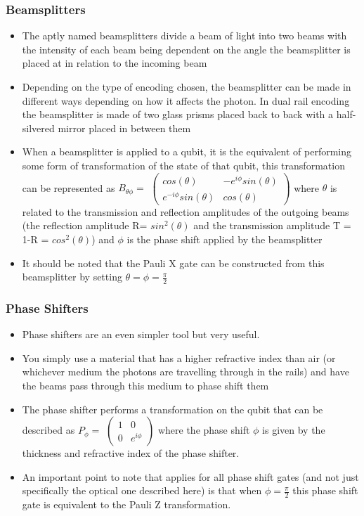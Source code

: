 \subsubsection{Beamsplitters}
\begin{itemize}
    \item The aptly named beamsplitters divide a beam of light into two beams with the intensity of each beam being dependent on the angle the beamsplitter is placed at in relation to the incoming beam
    \item Depending on the type of encoding  chosen, the beamsplitter can be made in different ways depending on how it affects the photon. In dual rail encoding the beamsplitter is made of two glass prisms placed back to back with a half-silvered mirror placed in between them %
    \item When a beamsplitter is applied to a qubit, it is the equivalent of performing some form of transformation of the state of that qubit, this transformation can be represented as $B_{\theta\phi} = $ $\begin{pmatrix}
    cos(\theta) & -e^{i\phi}sin(\theta) \\
    e^{-i\phi}sin(\theta) & cos(\theta) 
    \end{pmatrix}$ where $\theta$ is related to the transmission and reflection amplitudes of the outgoing beams (the reflection amplitude R= $sin^2(\theta)$ and the transmission amplitude T = 1-R = $cos^2(\theta)$) and $\phi$ is the phase shift applied by the beamsplitter
    \item It should be noted that the Pauli X gate can be constructed from this beamsplitter by setting $\theta = \phi = \frac{\pi}{2}$
    
\end{itemize}
\subsubsection{Phase Shifters}
\begin{itemize}
    \item Phase shifters are an even simpler tool but very useful.
    \item You simply use a material that has a higher refractive index than air (or whichever medium the photons are travelling through in the rails) and have the beams pass through this medium to phase shift them
    \item The phase shifter performs a transformation on the qubit that can be described as $P_\phi = $ $\begin{pmatrix}
    1 & 0 \\
    0 & e^{i\phi}
    \end{pmatrix}$ where the phase shift $\phi$ is given by the thickness and refractive index of the phase shifter.
    \item An important point to note that applies for all phase shift gates (and not just specifically the optical one described here) is that when $\phi = \frac{\pi}{2}$ this phase shift gate is equivalent to the Pauli Z transformation.
\end{itemize}
